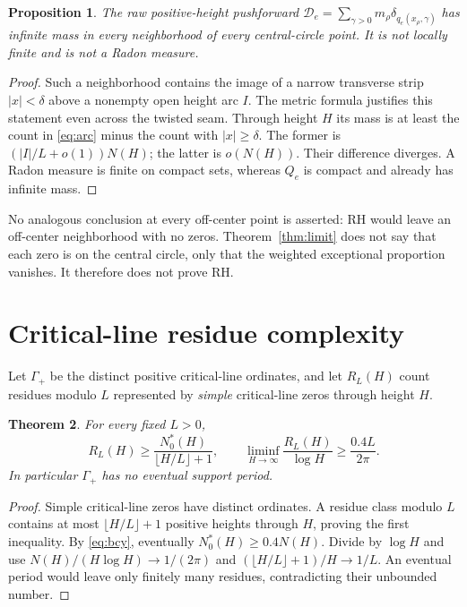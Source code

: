 \documentclass[11pt,a4paper]{article}
\newtheorem{theorem}{Theorem}[section]
\newtheorem{proposition}[theorem]{Proposition}
\theoremstyle{definition}
\theoremstyle{remark}
\begin{document}
\begin{proposition}\label{prop:raw}
The raw positive-height pushforward
$\mathcal D_e=\sum_{\gamma>0}m_\rho\delta_{q_e(x_\rho,\gamma)}$
has infinite mass in every neighborhood of every central-circle point.
It is not locally finite and is not a Radon measure.
\end{proposition}
\begin{proof}
Such a neighborhood contains the image of a narrow transverse strip
$|x|<\delta$ above a nonempty open height arc $I$. The metric formula justifies
this statement even across the twisted seam. Through height $H$ its mass is
at least the count in \eqref{eq:arc} minus the count with $|x|\ge\delta$.
The former is $(|I|/L+o(1))N(H)$; the latter is $o(N(H))$. Their difference
diverges. A Radon measure is finite on compact sets, whereas $Q_e$ is compact
and already has infinite mass.
\end{proof}

No analogous conclusion at every off-center point is asserted: RH would
leave an off-center neighborhood with no zeros. Theorem~\ref{thm:limit}
does not say that each zero is on the central circle, only that the weighted
exceptional proportion vanishes. It therefore does not prove RH.

\section{Critical-line residue complexity}

Let $\Gamma_+$ be the distinct positive critical-line ordinates, and let
$R_L(H)$ count residues modulo $L$ represented by \emph{simple} critical-line
zeros through height $H$.

\begin{theorem}\label{thm:residue}
For every fixed $L>0$,
\begin{equation}\label{eq:residue}
 R_L(H)\ge\frac{N_0^*(H)}{\lfloor H/L\rfloor+1},\qquad
 \liminf_{H\to\infty}\frac{R_L(H)}{\log H}
        \ge\frac{0.4L}{2\pi}.
\end{equation}
In particular $\Gamma_+$ has no eventual support period.
\end{theorem}
\begin{proof}
Simple critical-line zeros have distinct ordinates. A residue class modulo
$L$ contains at most $\lfloor H/L\rfloor+1$ positive heights through $H$,
proving the first inequality. By \eqref{eq:bcy}, eventually
$N_0^*(H)\ge0.4N(H)$. Divide by $\log H$ and use
$N(H)/(H\log H)\to1/(2\pi)$ and
$(\lfloor H/L\rfloor+1)/H\to1/L$. An eventual period would leave only
finitely many residues, contradicting their unbounded number.
\end{proof}
\end{document}
